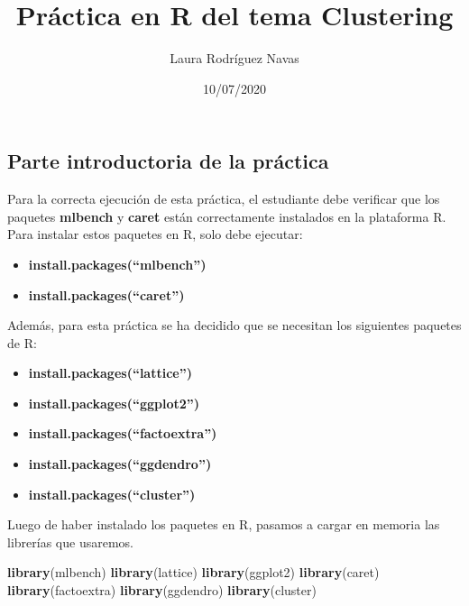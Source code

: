 \documentclass[
]{article}
\title{Práctica en R del tema Clustering}
\author{Laura Rodríguez Navas}
\date{10/07/2020}
\newenvironment{Shaded}{\begin{snugshade}}{\end{snugshade}}
\newcommand{\KeywordTok}[1]{\textcolor[rgb]{0.13,0.29,0.53}{\textbf{#1}}}
\newcommand{\NormalTok}[1]{#1}
\providecommand{\tightlist}{%
  \setlength{\itemsep}{0pt}\setlength{\parskip}{0pt}}
\begin{document}
\maketitle

\hypertarget{parte-introductoria-de-la-pruxe1ctica}{%
\subsection{Parte introductoria de la
práctica}\label{parte-introductoria-de-la-pruxe1ctica}}

Para la correcta ejecución de esta práctica, el estudiante debe
verificar que los paquetes \textbf{mlbench} y \textbf{caret} están
correctamente instalados en la plataforma R. Para instalar estos
paquetes en R, solo debe ejecutar:

\begin{itemize}
\tightlist
\item
  \textbf{install.packages(``mlbench'')}
\item
  \textbf{install.packages(``caret'')}
\end{itemize}

Además, para esta práctica se ha decidido que se necesitan los
siguientes paquetes de R:

\begin{itemize}
\tightlist
\item
  \textbf{install.packages(``lattice'')}
\item
  \textbf{install.packages(``ggplot2'')}
\item
  \textbf{install.packages(``factoextra'')}
\item
  \textbf{install.packages(``ggdendro'')}
\item
  \textbf{install.packages(``cluster'')}
\end{itemize}

Luego de haber instalado los paquetes en R, pasamos a cargar en memoria
las librerías que usaremos.

\begin{Shaded}
\begin{Highlighting}[]
\KeywordTok{library}\NormalTok{(mlbench)}
\KeywordTok{library}\NormalTok{(lattice)}
\KeywordTok{library}\NormalTok{(ggplot2)}
\KeywordTok{library}\NormalTok{(caret)}
\KeywordTok{library}\NormalTok{(factoextra)}
\KeywordTok{library}\NormalTok{(ggdendro)}
\KeywordTok{library}\NormalTok{(cluster)}
\end{Highlighting}
\end{Shaded}
\end{document}

